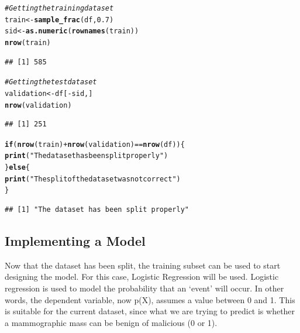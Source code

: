 \documentclass[a4paper,12pt]{article}\usepackage[]{graphicx}\usepackage[]{color}
\makeatletter
\newcommand{\hlnum}[1]{\textcolor[rgb]{0.686,0.059,0.569}{#1}}%
\newcommand{\hlstr}[1]{\textcolor[rgb]{0.192,0.494,0.8}{#1}}%
\newcommand{\hlcom}[1]{\textcolor[rgb]{0.678,0.584,0.686}{\textit{#1}}}%
\newcommand{\hlopt}[1]{\textcolor[rgb]{0,0,0}{#1}}%
\newcommand{\hlstd}[1]{\textcolor[rgb]{0.345,0.345,0.345}{#1}}%
\newcommand{\hlkwa}[1]{\textcolor[rgb]{0.161,0.373,0.58}{\textbf{#1}}}%
\newcommand{\hlkwb}[1]{\textcolor[rgb]{0.69,0.353,0.396}{#1}}%
\newcommand{\hlkwd}[1]{\textcolor[rgb]{0.737,0.353,0.396}{\textbf{#1}}}%
\newenvironment{kframe}{%
 \def\at@end@of@kframe{}%
 \ifinner\ifhmode%
  \def\at@end@of@kframe{\end{minipage}}%
  \begin{minipage}{\columnwidth}%
 \fi\fi%
 \def\FrameCommand##1{\hskip\@totalleftmargin \hskip-\fboxsep
 \colorbox{shadecolor}{##1}\hskip-\fboxsep
     \hskip-\linewidth \hskip-\@totalleftmargin \hskip\columnwidth}%
 \MakeFramed {\advance\hsize-\width
   \@totalleftmargin\z@ \linewidth\hsize
   \@setminipage}}%
 {\par\unskip\endMakeFramed%
 \at@end@of@kframe}
\newenvironment{knitrout}{}{} %
\makeatother
\begin{document}
\begin{knitrout}
\color{fgcolor}\begin{kframe}
\begin{alltt}
\hlcom{# Getting the training dataset}
\hlstd{train}\hlkwb{<-}\hlkwd{sample_frac}\hlstd{( df ,} \hlnum{0.7}\hlstd{)}
\hlstd{sid}\hlkwb{<-}\hlkwd{as.numeric}\hlstd{(}\hlkwd{rownames}\hlstd{(train))}
\hlkwd{nrow}\hlstd{(train)}
\end{alltt}
\begin{verbatim}
## [1] 585
\end{verbatim}
\begin{alltt}
\hlcom{# Getting the test dataset}
\hlstd{validation} \hlkwb{<-} \hlstd{df[}\hlopt{-}\hlstd{sid,]}
\hlkwd{nrow}\hlstd{(validation)}
\end{alltt}
\begin{verbatim}
## [1] 251
\end{verbatim}
\begin{alltt}
\hlkwa{if} \hlstd{(} \hlkwd{nrow}\hlstd{(train)} \hlopt{+} \hlkwd{nrow}\hlstd{(validation)} \hlopt{==} \hlkwd{nrow}\hlstd{(df) )\{}
  \hlkwd{print}\hlstd{(}\hlstr{"The dataset has been split properly"}\hlstd{)}
\hlstd{\}} \hlkwa{else} \hlstd{\{}
  \hlkwd{print}\hlstd{(}\hlstr{"The split of the dataset was not correct"}\hlstd{)}
\hlstd{\}}
\end{alltt}
\begin{verbatim}
## [1] "The dataset has been split properly"
\end{verbatim}
\end{kframe}
\end{knitrout}

\clearpage

\subsection{Implementing a Model}\label{model}
Now that the dataset has been split, the training subset can be used to start designing the model. For this case, Logistic Regression will be used. Logistic regression is used to model the probability that an ‘event’ will occur. In other words, the dependent variable, now p(X), assumes a value between 0 and 1. This is suitable for the current dataset, since what we are trying to predict is whether a mammographic mass can be benign of malicious (0 or 1).
\end{document}
